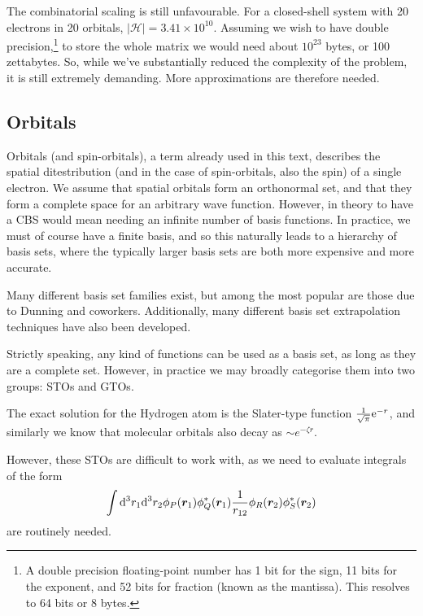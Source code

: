 The combinatorial scaling is still unfavourable. For a closed-shell system with 20 electrons in 20 orbitals, $|\mathcal{H}|=3.41\times 10^{10}$. Assuming we wish to have double precision,\footnote{A double precision floating-point number has 1 bit for the sign, 11 bits for the exponent, and 52 bits for fraction (known as the mantissa).\cite{ascherFirst2011} This resolves to 64 bits or 8 bytes.} to store the whole matrix we would need about $10^{23}$ bytes, or 100 zettabytes. So, while we've substantially reduced the complexity of the problem, it is still extremely demanding. More approximations are therefore needed.

\subsection{Orbitals}
\label{sec:orbitals}

Orbitals (and spin-orbitals), a term already used in this text, describes the spatial ditestribution (and in the case of spin-orbitals, also the spin) of a single electron. We assume that spatial orbitals form an orthonormal set, and that they form a complete space for an arbitrary wave function. However, in theory to have a \gls{CBS} would mean needing an infinite number of basis functions. In practice, we must of course have a finite basis, and so this naturally leads to a hierarchy of basis sets, where the typically larger basis sets are both more expensive and more accurate.

Many different basis set families exist, but among the most popular are those due to Dunning and coworkers.\cite{dunningGaussian1989a} Additionally, many different basis set extrapolation techniques have also been developed.\cite{fellerEffectiveness2011,halkierBasisset1998,halkierBasisset1999,helgakerBasisset1997,jensenBasis1999,pansiniExtrapolation2016,petersonBenchmark1994,woonBenchmark1994}

Strictly speaking, any kind of functions can be used as a basis set, as long as they are a complete set. However, in practice we may broadly categorise them into two groups: \glspl{STO} and \glspl{GTO}.

The exact solution for the Hydrogen atom is the Slater-type function $\frac 1{\sqrt{\pi}} \mathrm{e}^{-r}$, and similarly we know that molecular orbitals also decay as $\sim e^{-\zeta r}$.

However, these \glspl{STO} are difficult to work with, as we need to evaluate integrals of the form
\begin{equation}
    \label{eq:two-body-integral}
\int\mathrm{d}^3r_1\mathrm{d}^3r_2 \phi_P(\bm r_1)\phi_Q^*(\bm r_1)\frac 1 {r_{12}}\phi_R(\bm r_2)\phi_S^*(\bm r_2)
\end{equation}
are routinely needed.

